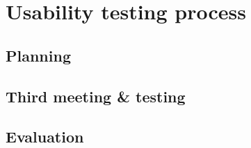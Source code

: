 \section{Usability testing process}

\subsection{Planning}

\subsection{Third meeting \& testing}

\subsection{Evaluation}
